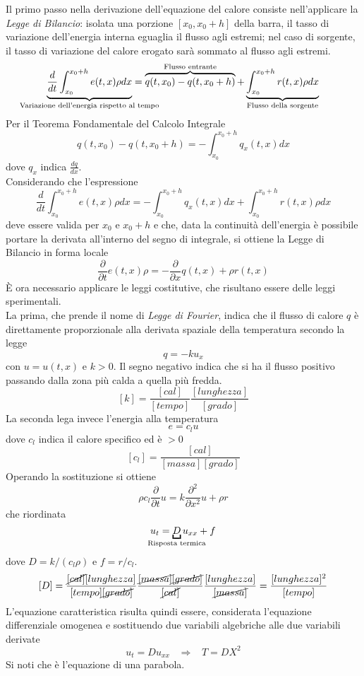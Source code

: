 Il primo passo nella derivazione dell'equazione del calore consiste
nell'applicare la \textit{Legge di Bilancio}:
isolata una porzione $[x_0, x_0+h]$ della barra, il tasso di variazione dell'energia interna eguaglia il flusso agli estremi;
nel caso di sorgente, il tasso di variazione del calore erogato sar\`a sommato al flusso agli estremi.
\[
	\underbrace{\frac{d}{dt}\int_{x_0}^{x_0+h} e(t,x)\rho
dx}_{\mathclap{\text{Variazione dell'energia rispetto al tempo}}}
	= \overbrace{q(t,x_0)-q(t,x_0 +h)}^\text{Flusso entrante}
	+\underbrace{\int_{x_0}^{x_0+h} r(t,x) \rho dx}_\text{Flusso della
sorgente}
\]
Per il Teorema Fondamentale del Calcolo Integrale
\[
	q(t,x_0)-q(t,x_0 +h) = -\int_{x_0}^{x_0+h} q_x(t,x)dx
\]
dove $q_x$ indica $\frac{dq}{dx}$.\\
Considerando che l'espressione
\[
	\frac{d}{dt}\int_{x_0}^{x_0+h} e(t,x)\rho dx
	= -\int_{x_0}^{x_0+h} q_x(t,x)dx
	+\int_{x_0}^{x_0+h} r(t,x) \rho dx
\]
deve essere valida per $x_0$ e $x_0+h$ e che, data la continuit\`a dell'energia
\`e possibile portare
la derivata all'interno del segno di integrale, si ottiene la Legge di Bilancio
in forma locale
\[
	\frac{\partial}{\partial t} e(t,x)\rho= -\frac{\partial}{\partial
x}q(t,x)+\rho r(t,x)
\]
\`E ora necessario applicare le leggi costitutive, che risultano essere delle
leggi sperimentali.\\
La prima, che prende il nome di \textit{Legge di Fourier}, indica che il flusso
di calore $q$ \`e direttamente proporzionale
alla derivata spaziale della temperatura secondo la legge
\[
	q= -ku_x
\]
con $u=u(t,x)$ e $k>0$. Il segno negativo indica che si ha il flusso positivo
passando dalla zona pi\`u calda a quella pi\`u fredda.
\[
	[k]= \frac{[cal]}{[tempo]}\frac{[lunghezza]}{[grado]}
\]
La seconda lega invece l'energia alla temperatura
\[
	e= c_lu
\]
dove $c_l$ indica il calore specifico ed \`e $>0$
\[
	[c_l]=\frac{[cal]}{[massa][grado]}
\]
Operando la sostituzione si ottiene
\[
	\rho c_l \frac{\partial}{\partial t} u= k \frac{\partial^2}{\partial
x^2}u + \rho r
\]
che riordinata
\[
	u_t= \underbracket{D}_{\mathclap{\text{Risposta termica}}} u_{xx}+f
\]
dove $D=k/(c_l\rho)$ e $f=r/c_l$.
\[
	[D]=\frac{\cancel{[cal]}[lunghezza]}{[tempo]\cancel{[grado]}}\frac{
\cancel{[massa]}\cancel{[grado]}}{\cancel{[cal]}}
	\frac{[lunghezza]}{\cancel{[massa]}}=\frac{[lunghezza]^2}{[tempo]}
\]
L'equazione caratteristica risulta quindi essere, considerata l'equazione
differenziale omogenea e sostituendo due variabili algebriche alle due variabili
derivate
\[
	u_t= Du_{xx} \;\;\; \Rightarrow \;\;\; T=DX^2
\]
Si noti che \`e l'equazione di una parabola.

